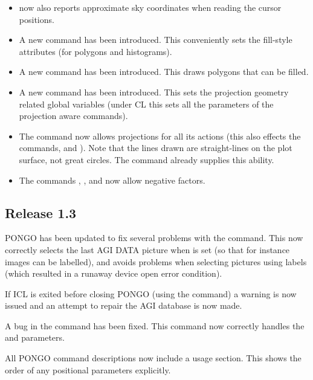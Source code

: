 \begin{itemize}
\item {} now also reports approximate sky coordinates when
reading the cursor positions.

\item A new command  has been introduced. This
conveniently sets the fill-style attributes (for polygons and
histograms).

\item A new command  has been introduced. This
draws polygons  that can be filled.

\item A new command  has been introduced. This sets the
projection geometry related global variables (under CL this sets all
the parameters of the projection aware commands).

\item The  command now allows projections for all its
actions (this also effects the commands,  and
). Note that the lines drawn are straight-lines on
the plot surface, not great circles. The 
command already supplies this ability.

\item The commands , ,
 and  now allow
negative factors.

\end{itemize}

\subsection{Release 1.3}

PONGO has been updated to fix several problems with the
 command. This now correctly selects the last AGI
DATA picture when  is set (so that for instance
 images can be labelled), and avoids problems
when selecting pictures using labels (which resulted in a runaway
device open error condition).

If ICL is exited before closing PONGO (using the 
command) a warning is now issued and an attempt to repair the AGI
database is now made.

A bug in the  command has been fixed. This command now
correctly handles the  and  parameters.

All PONGO command descriptions now include a usage section. This
shows the order of any positional parameters explicitly.

